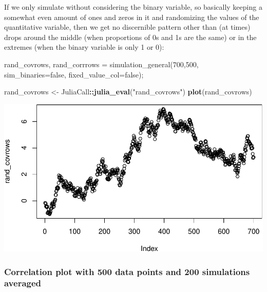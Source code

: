 \documentclass[]{article}
\newenvironment{Shaded}{\begin{snugshade}}{\end{snugshade}}
\newcommand{\FloatTok}[1]{\textcolor[rgb]{0.00,0.00,0.81}{#1}}
\newcommand{\KeywordTok}[1]{\textcolor[rgb]{0.13,0.29,0.53}{\textbf{#1}}}
\newcommand{\NormalTok}[1]{#1}
\newcommand{\OperatorTok}[1]{\textcolor[rgb]{0.81,0.36,0.00}{\textbf{#1}}}
\newcommand{\StringTok}[1]{\textcolor[rgb]{0.31,0.60,0.02}{#1}}
\begin{document}
If we only simulate without considering the binary variable, so
basically keeping a somewhat even amount of ones and zeros in it and
randomizing the values of the quantitative variable, then we get no
discernible pattern other than (at times) drops around the middle (when
proportions of 0s and 1s are the same) or in the extremes (when the
binary variable is only 1 or 0):

\begin{Shaded}
\begin{Highlighting}[]
\NormalTok{rand_covrows, rand_corrrows = simulation_general(}\FloatTok{700}\NormalTok{,}\FloatTok{500}\NormalTok{, }
\NormalTok{                                        sim_binaries=false, fixed_value_col=false);}
\end{Highlighting}
\end{Shaded}

\begin{Shaded}
\begin{Highlighting}[]
\NormalTok{rand_covrows <-}\StringTok{ }\NormalTok{JuliaCall}\OperatorTok{::}\KeywordTok{julia_eval}\NormalTok{(}\StringTok{"rand_covrows"}\NormalTok{)}
\KeywordTok{plot}\NormalTok{(rand_covrows)}
\end{Highlighting}
\end{Shaded}

\includegraphics{./figures/unnamed-chunk-15-1.pdf}

\newpage

\hypertarget{correlation-plot-with-500-data-points-and-200-simulations-averaged}{%
\subsubsection{Correlation plot with 500 data points and 200 simulations
averaged}\label{correlation-plot-with-500-data-points-and-200-simulations-averaged}}
\end{document}
